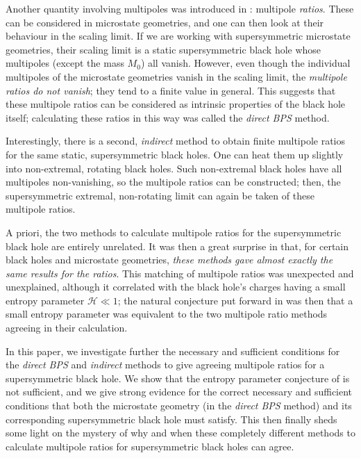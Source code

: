 \documentclass[12pt,a4paper]{article}
\def\indirect{\emph{indirect} }
\def\direct{\emph{direct BPS} }
\begin{document}
Another quantity involving multipoles was introduced in \cite{Bena:2020see,Bena:2020uup}: multipole \emph{ratios}. These can be considered in microstate geometries, and one can then look at their behaviour in the scaling limit. If we are working with supersymmetric microstate geometries, their scaling limit is a static supersymmetric black hole whose multipoles (except the mass $M_0$) all vanish. However, even though the individual multipoles of the microstate geometries vanish in the scaling limit, the \emph{multipole ratios do not vanish}; they tend to a finite value in general. This suggests that these multipole ratios can be considered as intrinsic properties of the black hole itself; calculating these ratios in this way was called the \direct method.

Interestingly, there is a second, \indirect method to obtain finite multipole ratios for the same static, supersymmetric black holes. One can heat them up slightly into non-extremal, rotating black holes. Such non-extremal black holes have all multipoles non-vanishing, so the multipole ratios can be constructed; then, the supersymmetric extremal, non-rotating limit can again be taken of these multipole ratios.

A priori, the two methods to calculate multipole ratios for the supersymmetric black hole are entirely unrelated. It was then a great surprise in \cite{Bena:2020see,Bena:2020uup} that, for certain black holes and microstate geometries, \emph{these methods gave almost exactly the same results for the ratios}. This matching of multipole ratios was unexpected and unexplained, although it correlated with the black hole's charges having a small entropy parameter $\mathcal{H}\ll 1$; the natural conjecture put forward in \cite{Bena:2020see,Bena:2020uup} was then that a small entropy parameter was equivalent to the two multipole ratio methods agreeing in their calculation.

In this paper, we investigate further the necessary and sufficient conditions for the \direct and \indirect methods to give agreeing multipole ratios for a supersymmetric black hole. We show that the entropy parameter conjecture of \cite{Bena:2020see,Bena:2020uup} is not sufficient, and we give strong evidence for the correct necessary and sufficient conditions that both the microstate geometry (in the \direct method) and its corresponding supersymmetric black hole must satisfy. This then finally sheds some light on the mystery of why and when these completely different methods to calculate multipole ratios for supersymmetric black holes can agree.
\end{document}
